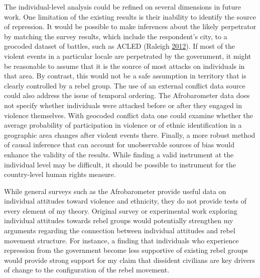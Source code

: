 \documentclass[12pt,]{book}
\theoremstyle{definition}
\theoremstyle{definition}
\theoremstyle{remark}
\begin{document}
The individual-level analysis could be refined on several dimensions in
future work. One limitation of the existing results is their inability
to identify the source of repression. It would be possible to make
inferences about the likely perpetrator by matching the survey results,
which include the respondent's city, to a geocoded dataset of battles,
such as ACLED (Raleigh \protect\hyperlink{ref-Raleigh2012a}{2012}). If
most of the violent events in a particular locale are perpetrated by the
government, it might be reasonable to assume that it is the source of
most attacks on individuals in that area. By contrast, this would not be
a safe assumption in territory that is clearly controlled by a rebel
group. The use of an external conflict data source could also address
the issue of temporal ordering. The Afrobarometer data does not specify
whether individuals were attacked before or after they engaged in
violence themselves. With geocoded conflict data one could examine
whether the average probability of participation in violence or of
ethnic identification in a geographic area changes after violent events
there. Finally, a more robust method of causal inference that can
account for unobservable sources of bias would enhance the validity of
the results. While finding a valid instrument at the individual level
may be difficult, it should be possible to instrument for the
country-level human rights measure.

While general surveys such as the Afrobarometer provide useful data on
individual attitudes toward violence and ethnicity, they do not provide
tests of every element of my theory. Original survey or experimental
work exploring individual attitudes towards rebel groups would
potentially strengthen my arguments regarding the connection between
individual attitudes and rebel movement structure. For instance, a
finding that individuals who experience repression from the government
become less supportive of existing rebel groups would provide strong
support for my claim that dissident civilians are key drivers of change
to the configuration of the rebel movement.
\end{document}
